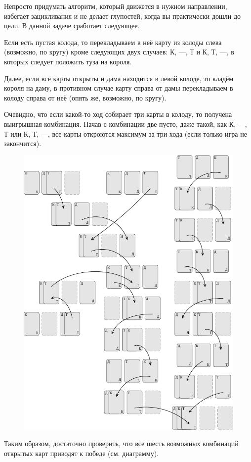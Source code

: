 \documentclass[twoside]{book}
\begin{document}
Непросто придумать алгоритм, который движется в нужном направлении, избегает зацикливания и не делает глупостей, когда вы практически дошли до цели.
В данной задаче сработает следующее.

\medskip

Если есть пустая колода, то перекладываем в неё карту из колоды слева (возможно, по кругу) кроме следующих двух случаев: К, ---, Т и К, Т, ---, в которых следует положить туза на короля.

Далее, если все карты открыты и дама находится в левой колоде, то кладём короля на даму, в противном случае карту справа от дамы перекладываем в колоду справа от неё (опять же, возможно, по кругу).

Очевидно, что если какой-то ход собирает три карты в колоду, то получена выигрышная комбинация.
Начав с комбинации две-пусто, даже такой, как К, ---, Т или
К, Т, ---, все карты откроются максимум за три хода (если только игра не закончится).
\begin{figure}[!ht]
\centering
 \includegraphics{mp/wink-24}
\end{figure}
Таким образом, достаточно проверить, что все шесть возможных комбинаций открытых карт приводят к победе  (см. диаграмму).
\heart
\end{document}
